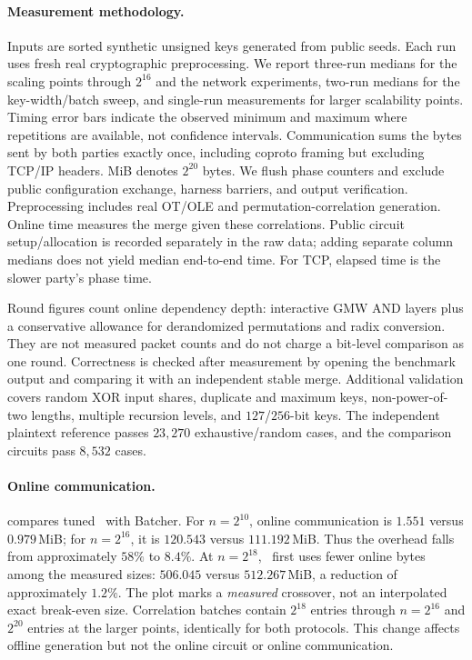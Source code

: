 \paragraph{Measurement methodology.}
Inputs are sorted synthetic unsigned keys generated from public seeds.
Each run uses fresh real cryptographic preprocessing. We report three-run
medians for the scaling points through $2^{16}$ and the network experiments,
two-run medians for the key-width/batch sweep, and single-run measurements for
larger scalability points. Timing error bars indicate the observed minimum
and maximum where repetitions are available, not confidence intervals.
Communication sums the bytes sent by both parties exactly once, including
coproto framing but excluding TCP/IP headers. MiB denotes $2^{20}$ bytes.
We flush phase counters and exclude public configuration exchange, harness
barriers, and output verification. Preprocessing includes real OT/OLE and
permutation-correlation generation. Online time measures the merge given these
correlations. Public circuit setup/allocation is recorded separately in the raw
data; adding separate column medians does not yield median end-to-end time.
For TCP, elapsed time is the slower party's phase time.

Round figures count online dependency depth: interactive GMW AND layers plus
a conservative allowance for derandomized permutations and radix conversion.
They are not measured packet counts and do not charge a bit-level comparison
as one round. Correctness is checked after measurement by opening the benchmark
output and comparing it with an independent stable merge. Additional validation
covers random XOR input shares, duplicate and maximum keys, non-power-of-two
lengths, multiple recursion levels, and $127$/$256$-bit keys. The independent
plaintext reference passes $23{,}270$ exhaustive/random cases, and the comparison
circuits pass $8{,}532$ cases.

\paragraph{Online communication.}
 compares tuned \ourprotocol\ with Batcher.
For $n=2^{10}$, online communication is $1.551$ versus $0.979$\,MiB;
for $n=2^{16}$, it is $120.543$ versus $111.192$\,MiB. Thus the overhead
falls from approximately $58\%$ to $8.4\%$. At $n=2^{18}$, \ourprotocol\ first
uses fewer online bytes among the measured sizes: $506.045$ versus
$512.267$\,MiB, a reduction of approximately $1.2\%$. The plot marks a
\emph{measured} crossover, not an interpolated exact break-even size.
Correlation batches contain $2^{18}$ entries through $n=2^{16}$ and $2^{20}$
entries at the larger points, identically for both protocols. This change affects
offline generation but not the online circuit or online communication.

